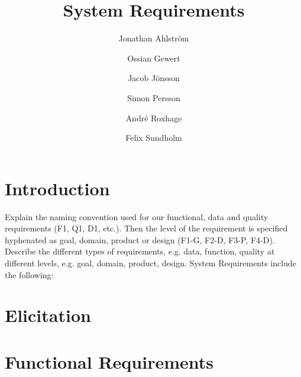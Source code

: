 \documentclass[a4paper]{article}
\title{System Requirements}
\author{Jonathan Ahlström \and Ossian Gewert \and Jacob Jönsson \and Simon Persson \and André Roxhage \and Felix Sundholm}
\begin{document}
\maketitle

\begin{center}
    
\end{center}

\tableofcontents

\section{Introduction}
Explain the naming convention used for our functional, data and quality requirements (F1, Q1, D1, etc.). Then the level of the requirement is specified hyphenated as goal, domain, product or design (F1-G, F2-D, F3-P, F4-D). Describe the different types of requirements, e.g. data, function, quality at different levels, e.g. goal, domain, product, design.
System Requirements include the following:

\section{Elicitation}


\section{Functional Requirements}

\end{document}
